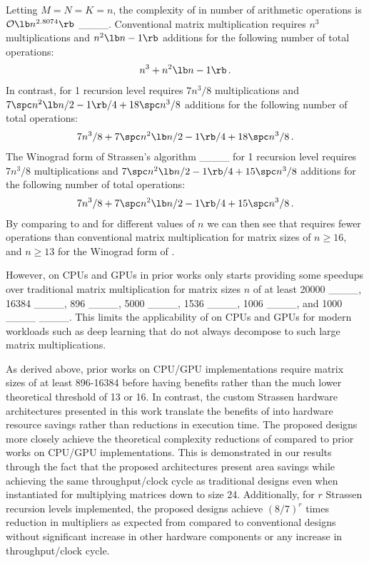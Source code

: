 Letting $M = N = K = n$, the complexity of \sa in number of arithmetic operations is $\mathcal{O}\lb n^{2.8074}\rb$ ____.
Conventional matrix multiplication  requires $n^3$ multiplications and $n^2\lb n-1 \rb$ additions for the following number of total operations:
\begin{align}
  \label{smm:eq:mm-ops}
  n^3 + n^2\lb n-1 \rb \,.
\end{align}
In contrast, \sa {} for 1 recursion level requires $7n^3/8$ multiplications and $7\spc n^2\lb n/2-1 \rb/4 + 18\spc n^3/8$ additions for the following number of total operations:
\begin{align}
  \label{smm:eq:smm-ops}
  7n^3/8 + 7\spc n^2\lb n/2-1 \rb/4 + 18\spc n^3/8 \,.
\end{align}
The Winograd form of Strassen's algorithm ____ for 1 recursion level requires $7n^3/8$ multiplications and $7\spc n^2\lb n/2-1 \rb/4 + 15\spc n^3/8$ additions for the following number of total operations:
\begin{align}
  \label{smm:eq:swmm-ops}
  7n^3/8 + 7\spc n^2\lb n/2-1 \rb/4 + 15\spc n^3/8 \,.
\end{align}
By comparing  to  and  for different values of $n$ we can then see that \sa requires fewer operations than conventional matrix multiplication for matrix sizes of $n \ge 16$, and $n \ge 13$ for the Winograd form of \sa.

However, \sa on CPUs and GPUs in prior works only starts providing some speedups over traditional matrix multiplication for matrix sizes $n$ of at least 20000 ____, 16384 ____, 896 ____, 5000 ____, 1536 ____, 1006 ____, and 1000 ____ ____.
This limits the applicability of \sa on CPUs and GPUs for modern workloads such as deep learning that do not always decompose to such large matrix multiplications.

As derived above, prior works on CPU/GPU implementations require matrix sizes of at least 896-16384 before having benefits rather than the much lower theoretical threshold of 13 or 16.
In contrast, the custom Strassen hardware architectures presented in this work translate the benefits of \sa into hardware resource savings rather than reductions in execution time.
The proposed designs more closely achieve the theoretical complexity reductions of \sa compared to prior works on CPU/GPU implementations.
This is demonstrated in our results through the fact that the proposed architectures present area savings while achieving the same throughput/clock cycle as traditional designs even when instantiated for multiplying matrices down to size 24.
Additionally, for $r$ Strassen recursion levels implemented, the proposed designs achieve $(8/7)^r$ times reduction in multipliers as expected from \seq compared to conventional designs without significant increase in other hardware components or any increase in throughput/clock cycle.

